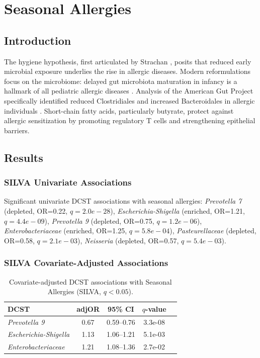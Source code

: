 \documentclass[11pt,a4paper]{article}
\begin{document}
\section{Seasonal Allergies}
\subsection{Introduction}
The hygiene hypothesis, first articulated by Strachan \cite{Strachan1989_hygiene}, posits that reduced early microbial exposure underlies the rise in allergic diseases. Modern reformulations focus on the microbiome: delayed gut microbiota maturation in infancy is a hallmark of all pediatric allergic diseases \cite{Hoskinson2023_allergy}. Analysis of the American Gut Project specifically identified reduced Clostridiales and increased Bacteroidales in allergic individuals \cite{Hua2016_AGP_allergy}. Short-chain fatty acids, particularly butyrate, protect against allergic sensitization by promoting regulatory T cells and strengthening epithelial barriers.

\subsection{Results}
\subsubsection{SILVA Univariate Associations}
Significant univariate DCST associations with seasonal allergies: \textit{Prevotella 7} (depleted, OR=0.22, $q=2.0e-28$), \textit{Escherichia-Shigella} (enriched, OR=1.21, $q=4.4e-09$), \textit{Prevotella 9} (depleted, OR=0.75, $q=1.2e-06$), \textit{Enterobacteriaceae} (enriched, OR=1.25, $q=5.8e-04$), \textit{Pasteurellaceae} (depleted, OR=0.58, $q=2.1e-03$), \textit{Neisseria} (depleted, OR=0.57, $q=5.4e-03$).

\subsubsection{SILVA Covariate-Adjusted Associations}
\begin{table}[H]\centering\small
\caption{Covariate-adjusted DCST associations with Seasonal Allergies (SILVA, $q<0.05$).}\label{tab:Seasonal_allergies_adj}
\begin{tabular}{lcccc}
\toprule
DCST & adjOR & 95\% CI & $q$-value \\
\midrule
\textit{Prevotella 9} & 0.67 & 0.59--0.76 & 3.3e-08 \\
\textit{Escherichia-Shigella} & 1.13 & 1.06--1.21 & 5.1e-03 \\
\textit{Enterobacteriaceae} & 1.21 & 1.08--1.36 & 2.7e-02 \\
\bottomrule
\end{tabular}\end{table}
\end{document}
